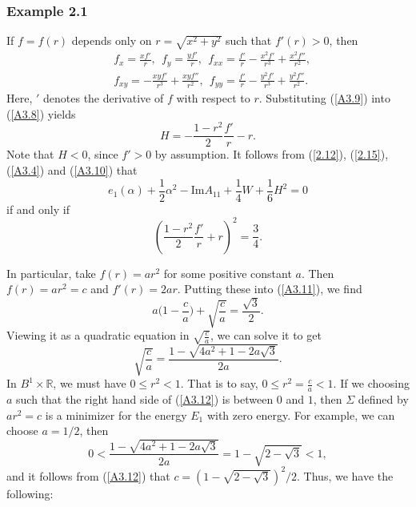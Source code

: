 \documentclass{amsart}
\theoremstyle{Corollary}
\numberwithin{equation}{section}
\begin{document}
\subsubsection{Example 2.1} If $f=f(r)$ depends only on $r=\sqrt{x^2+y^2}$ such that $f'(r)>0$, then
\begin{equation}\label{A3.9}
\begin{split}
&f_x=\frac{xf'}{r}, ~~f_y=\frac{yf'}{r},~~f_{xx}=\frac{f'}{r}-\frac{x^2f'}{r^3}+\frac{x^2f''}{r^2},\\
&
f_{xy}=-\frac{xyf'}{r^3}+\frac{xyf''}{r^2} ,~~
f_{yy}=\frac{f'}{r}-\frac{y^2f'}{r^3}+\frac{y^2f''}{r^2}.
\end{split}
\end{equation}
Here, $'$ denotes the derivative of $f$ with respect to $r$. 
Substituting (\ref{A3.9}) into (\ref{A3.8}) yields 
\begin{equation}\label{A3.10}
H=-\frac{1-r^2}{2}\frac{f'}{r}-r.
\end{equation}
Note that $H<0$, since $f'>0$ by assumption. 
It follows from (\ref{2.12}), (\ref{2.15}), (\ref{A3.4}) and (\ref{A3.10}) that 
$$e_1(\alpha)+\frac{1}{2}\alpha^2-\mbox{Im} A_{11}+\frac{1}{4}W+\frac{1}{6}H^2
=0$$
if and only if 
\begin{equation}\label{A3.11}
\left(\frac{1-r^2}{2}\frac{f'}{r}+r\right)^2=\frac{3}{4}.
\end{equation}



In particular, take $f(r)=ar^2$ for some positive constant $a$. Then $f(r)=ar^2=c$ and 
$f'(r)=2ar$. Putting these into (\ref{A3.11}),  we find
\begin{equation*}
a\Big(1-\frac{c}{a}\Big)+\sqrt{\frac{c}{a}} =\frac{\sqrt{3}}{2}.
\end{equation*}
Viewing it as a quadratic equation in $\sqrt{\frac{c}{a}}
$, we can solve it to get 
\begin{equation}\label{A3.12}
\sqrt{\frac{c}{a}}=\frac{1-\sqrt{4a^2+1-2a\sqrt{3}}}{2a}.
\end{equation}
In $B^1\times\mathbb{R}$, we must have $0\leq r^2<1$. 
That is to say, $0\leq r^2=\frac{c}{a}<1$. 
If we choosing $a$ such that the right hand side of (\ref{A3.12}) 
is between $0$ and $1$, 
then $\Sigma$ defined by 
$ar^2=c$ is a minimizer for the energy $E_1$ with zero energy. 
For example, we can choose $a=1/2$, then 
$$0<\frac{1-\sqrt{4a^2+1-2a\sqrt{3}}}{2a}=1-\sqrt{2-\sqrt{3}}<1,$$
and it follows from (\ref{A3.12}) that 
$c=(1-\sqrt{2-\sqrt{3}})^2/2$. 
Thus, we have the following: 
\end{document}
